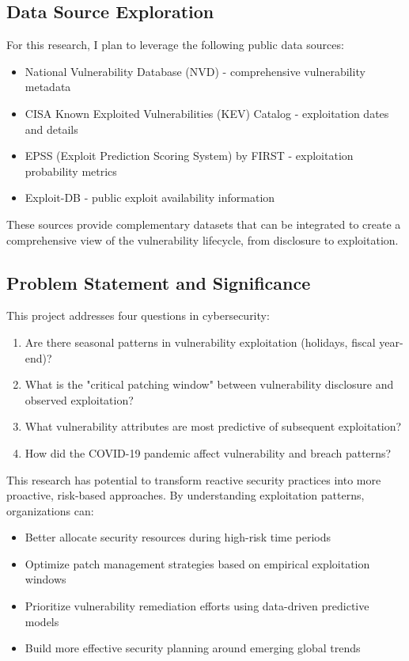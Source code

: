 \documentclass[runningheads]{llncs}
\begin{document}
\subsection{Data Source Exploration}
For this research, I plan to leverage the following public data sources:
\begin{itemize}
    \item National Vulnerability Database (NVD) -  comprehensive vulnerability metadata
    \item CISA Known Exploited Vulnerabilities (KEV) Catalog -  exploitation dates and details
    \item EPSS (Exploit Prediction Scoring System) by FIRST -  exploitation probability metrics
    \item Exploit-DB -  public exploit availability information
\end{itemize}

These sources provide complementary datasets that can be integrated to create a comprehensive view of the vulnerability lifecycle, from disclosure to exploitation.

\subsection{Problem Statement and Significance}
This project addresses four questions in cybersecurity:
\begin{enumerate}
    \item Are there seasonal patterns in vulnerability exploitation (holidays, fiscal year-end)?
    \item What is the "critical patching window" between vulnerability disclosure and observed exploitation?
    \item What vulnerability attributes are most predictive of subsequent exploitation?
    \item How did the COVID-19 pandemic affect vulnerability and breach patterns?
\end{enumerate}

This research has potential to transform reactive security practices into more proactive, risk-based approaches. By understanding exploitation patterns, organizations can:
\begin{itemize}
    \item Better allocate security resources during high-risk time periods
    \item Optimize patch management strategies based on empirical exploitation windows
    \item Prioritize vulnerability remediation efforts using data-driven predictive models
    \item Build more effective security planning around emerging global trends
\end{itemize}
\end{document}
